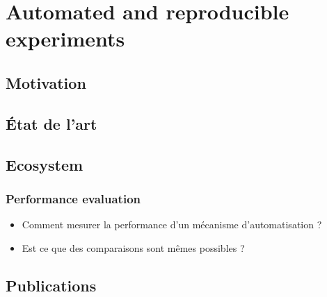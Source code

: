 
\chapter{Automated and reproducible experiments} %
\label{cha:automated_and_reproducible_experiments}

\minitoc

\section{Motivation} %
\label{sec:automation_motivation}

\cite{leone2013makesense}
\lipsum


\section{État de l'art} %
\label{sec:_tat_de_l_art}

\lipsum


\section{Ecosystem} %
\label{sec:automation_ecosystem}

\lipsum

\subsection{Performance evaluation} %
\label{sub:performance_evaluation}

\begin{itemize}
	\item Comment mesurer la performance d'un mécanisme d'automatisation ?
	\item Est ce que des comparaisons sont mêmes possibles ?
\end{itemize}



\section{Publications} %
\label{sec:automated_publications}


